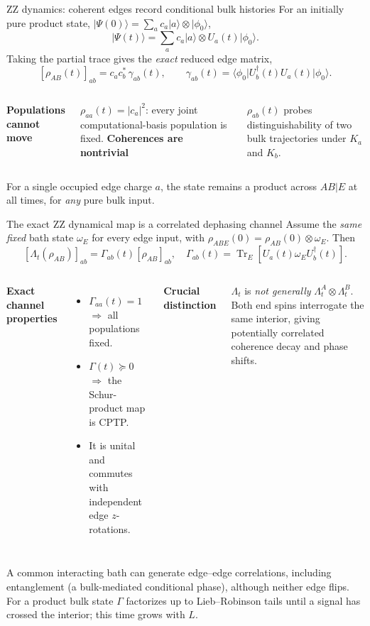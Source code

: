 \documentclass[aspectratio=169,10pt]{beamer}
\newcommand{\Tr}{\operatorname{Tr}}
\newcommand{\ket}[1]{\lvert #1\rangle}
\newcommand{\bra}[1]{\langle #1\rvert}
\newcommand{\sechead}[1]{{\color{sea}\bfseries #1}\par\vspace{1mm}}
\newcommand{\noteinline}[1]{{\color{muted}\footnotesize #1}}
\begin{document}
\begin{frame}{ZZ dynamics: coherent edges record conditional bulk histories}
For an initially pure product state, \(\ket{\Psi(0)}=\sum_a c_a\ket a\otimes\ket{\phi_0}\),
\[
\ket{\Psi(t)}=\sum_a c_a\ket a\otimes U_a(t)\ket{\phi_0}.
\]
Taking the partial trace gives the \emph{exact} reduced edge matrix,
\[
\boxed{[\rho_{AB}(t)]_{ab}=c_ac_b^*\,\gamma_{ab}(t),\qquad
\gamma_{ab}(t)=\bra{\phi_0}U_b^\dagger(t)U_a(t)\ket{\phi_0}.}
\]
\begin{columns}[T,onlytextwidth]
\sechead{Populations cannot move}
\(\rho_{aa}(t)=|c_a|^2\): every joint computational-basis population is fixed.
\sechead{Coherences are nontrivial}
\(\rho_{ab}(t)\) probes distinguishability of two bulk trajectories under \(K_a\) and \(K_b\).
\end{columns}
\smallskip
\noteinline{For a single occupied edge charge \(a\), the state remains a product across \(AB|E\) at all times, for \emph{any} pure bulk input.}
\end{frame}


\begin{frame}{The exact ZZ dynamical map is a correlated dephasing channel}
Assume the \emph{same fixed} bath state \(\omega_E\) for every edge input, with \(\rho_{ABE}(0)=\rho_{AB}(0)\otimes\omega_E\). Then
\[
\boxed{[\Lambda_t(\rho_{AB})]_{ab}
=\Gamma_{ab}(t)[\rho_{AB}]_{ab},\quad
\Gamma_{ab}(t)=\Tr_E[U_a(t)\omega_E U_b^\dagger(t)].}
\]
\begin{columns}[T,onlytextwidth]
\sechead{Exact channel properties}
\begin{itemize}\setlength\itemsep{3pt}
\item \(\Gamma_{aa}(t)=1\) \(\Rightarrow\) all populations fixed.
\item \(\Gamma(t)\succeq0\) \(\Rightarrow\) the Schur-product map is CPTP.
\item It is unital and commutes with independent edge \(z\)-rotations.
\end{itemize}
\sechead{Crucial distinction}
\(\Lambda_t\) is \emph{not generally} \(\Lambda_t^A\otimes\Lambda_t^B\). Both end spins interrogate the same interior, giving potentially correlated coherence decay and phase shifts.
\end{columns}
\vspace{.1cm}
\noteinline{A common interacting bath can generate edge--edge correlations, including entanglement (a bulk-mediated conditional phase), although neither edge flips. For a product bulk state \(\Gamma\) factorizes up to Lieb--Robinson tails until a signal has crossed the interior; this time grows with \(L\).}
\end{frame}
\end{document}
